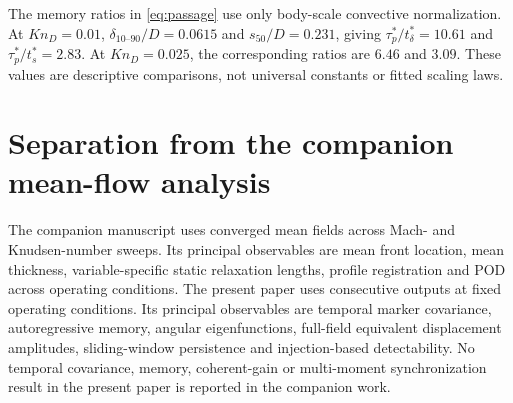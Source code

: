 \documentclass[paper]{JFM-FLM_Au}
\newcommand{\KnD}{Kn_D}
\newcommand{\scenter}{s_{50}}
\newcommand{\deltaten}{\delta_{10\text{--}90}}
\begin{document}
The memory ratios in \cref{eq:passage} use only body-scale convective normalization. At $\KnD=0.01$, $\deltaten/D=0.0615$ and $\scenter/D=0.231$, giving $\tau_p^*/t_\delta^*=10.61$ and $\tau_p^*/t_s^*=2.83$. At $\KnD=0.025$, the corresponding ratios are $6.46$ and $3.09$. These values are descriptive comparisons, not universal constants or fitted scaling laws.

\section{Separation from the companion mean-flow analysis}
The companion manuscript \citep{RoohiShoja2026Mean} uses converged mean fields across Mach- and Knudsen-number sweeps. Its principal observables are mean front location, mean thickness, variable-specific static relaxation lengths, profile registration and POD across operating conditions. The present paper uses consecutive outputs at fixed operating conditions. Its principal observables are temporal marker covariance, autoregressive memory, angular eigenfunctions, full-field equivalent displacement amplitudes, sliding-window persistence and injection-based detectability. No temporal covariance, memory, coherent-gain or multi-moment synchronization result in the present paper is reported in the companion work.



\end{document}

